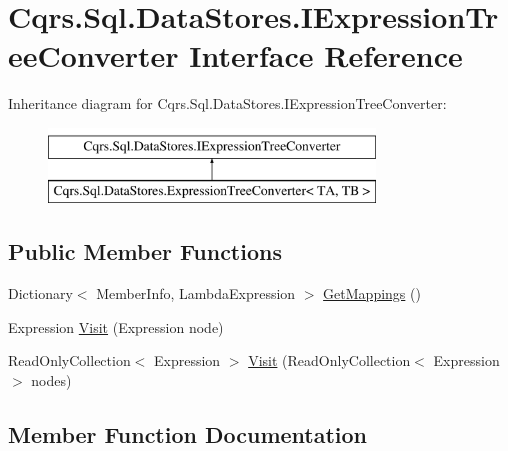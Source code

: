 \hypertarget{interfaceCqrs_1_1Sql_1_1DataStores_1_1IExpressionTreeConverter}{}\section{Cqrs.\+Sql.\+Data\+Stores.\+I\+Expression\+Tree\+Converter Interface Reference}
\label{interfaceCqrs_1_1Sql_1_1DataStores_1_1IExpressionTreeConverter}
Inheritance diagram for Cqrs.\+Sql.\+Data\+Stores.\+I\+Expression\+Tree\+Converter\+:\begin{figure}[H]
\begin{center}
\leavevmode
\includegraphics[height=2.000000cm]{interfaceCqrs_1_1Sql_1_1DataStores_1_1IExpressionTreeConverter}
\end{center}
\end{figure}
\subsection*{Public Member Functions}
\begin{DoxyCompactItemize}
\item 
Dictionary$<$ Member\+Info, Lambda\+Expression $>$ \hyperlink{interfaceCqrs_1_1Sql_1_1DataStores_1_1IExpressionTreeConverter_ad48480ecf7056a2b2cc079006cc2a589}{Get\+Mappings} ()
\item 
Expression \hyperlink{interfaceCqrs_1_1Sql_1_1DataStores_1_1IExpressionTreeConverter_ae5904ce74f9184703c51b58840770172}{Visit} (Expression node)
\item 
Read\+Only\+Collection$<$ Expression $>$ \hyperlink{interfaceCqrs_1_1Sql_1_1DataStores_1_1IExpressionTreeConverter_a24431bb6665d6d9b617f244049190655}{Visit} (Read\+Only\+Collection$<$ Expression $>$ nodes)
\end{DoxyCompactItemize}


\subsection{Member Function Documentation}
\mbox{\label{interfaceCqrs_1_1Sql_1_1DataStores_1_1IExpressionTreeConverter_ad48480ecf7056a2b2cc079006cc2a589}} 
